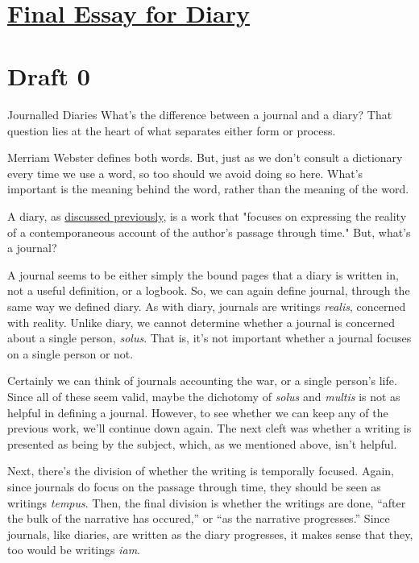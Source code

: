 \documentclass[12pt]{article}[titlepage]
\newcommand{\say}[1]{``#1''}
\newcommand{\1}{\={a}}
\newcommand{\2}{\={e}}
\newcommand{\3}{\={\i}}
\newcommand{\4}{\=o}
\newcommand{\5}{\=u}
\newcommand{\6}{\={A}}
\renewcommand{\,}{\textsuperscript{,}}
\begin{document}

\doublespacing
\section{\href{.html}{Final Essay for Diary}}


\section{Draft 0}
Journalled Diaries
What's the difference between a journal and a diary?
That question lies at the heart of what separates either form or process.

Merriam Webster defines both words.
But, just as we don't consult a dictionary every time we use a word, so too should we avoid doing so here.
What's important is the meaning behind the word, rather than the meaning of the word.

A diary, as \href{defining-diary.html}{discussed previously}, is a work that "focuses on expressing the reality of a contemporaneous account of the author's passage through time."
But, what's a journal?

A journal seems to be either simply the bound pages that a diary is written in, not a useful definition, or a logbook.
So, we can again define journal, through the same way we defined diary.
As with diary, journals are writings \textit{realis}, concerned with reality.
Unlike diary, we cannot determine whether a journal is concerned about a single person, \textit{solus}.
That is, it's not important whether a journal focuses on a single person or not.

Certainly we can think of journals accounting the war, or a single person's life.
Since all of these seem valid, maybe the dichotomy of \textit{solus} and \textit{multis} is not as helpful in defining a journal.
However, to see whether we can keep any of the previous work, we'll continue down again.
The next cleft was whether a writing is presented as being by the subject, which, as we mentioned above, isn't helpful.

Next, there's the division of whether the writing is temporally focused.
Again, since journals do focus on the passage through time, they should be seen as writings \textit{tempus}.
Then, the final division is whether the writings are done, \say{after the bulk of the narrative has occured,} or \say{as the narrative progresses.}
Since journals, like diaries, are written as the diary progresses, it makes sense that they, too would be writings \textit{iam}.
\end{document}
